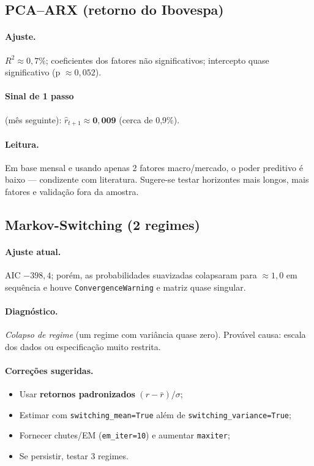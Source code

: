 \documentclass[11pt,a4paper]{article}
\begin{document}
\subsection{PCA--ARX (retorno do Ibovespa)}
\paragraph{Ajuste.} \(R^2 \approx 0{,}7\%\); coeficientes dos fatores não significativos; intercepto quase significativo (p \(\approx 0{,}052\)).
\paragraph{Sinal de 1 passo} (mês seguinte): \(\widehat{r}_{t+1} \approx \mathbf{0{,}009}\) (cerca de 0{,}9\%).
\paragraph{Leitura.} Em base mensal e usando apenas 2 fatores macro/mercado, o poder preditivo é baixo — condizente com literatura. Sugere-se testar horizontes mais longos, mais fatores e validação fora da amostra.

\subsection{Markov-Switching (2 regimes)}
\paragraph{Ajuste atual.} AIC \(-398{,}4\); porém, as probabilidades suavizadas colapsaram para \(\approx 1{,}0\) em sequência e houve \texttt{ConvergenceWarning} e matriz quase singular.
\paragraph{Diagnóstico.} \emph{Colapso de regime} (um regime com variância quase zero). Provável causa: escala dos dados ou especificação muito restrita.
\paragraph{Correções sugeridas.}
\begin{itemize}
  \item Usar \textbf{retornos padronizados} \((r-\bar r)/\sigma\);
  \item Estimar com \texttt{switching\_mean=True} além de \texttt{switching\_variance=True};
  \item Fornecer chutes/EM (\texttt{em\_iter=10}) e aumentar \texttt{maxiter};
  \item Se persistir, testar 3 regimes.
\end{itemize}
\end{document}
